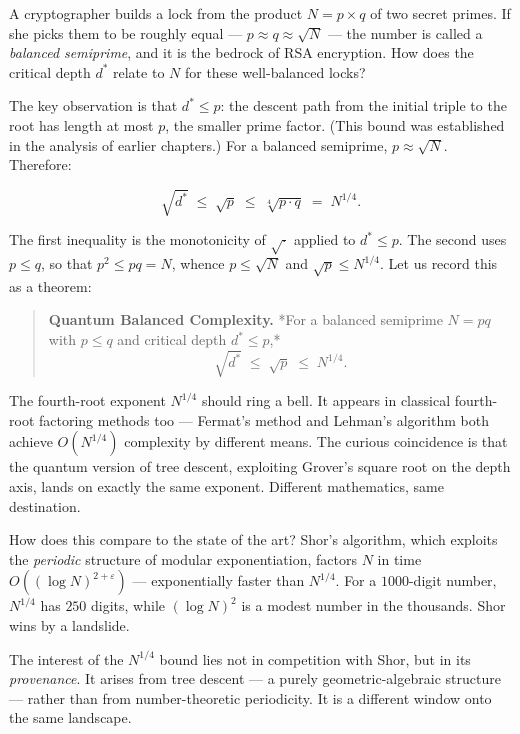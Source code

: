 \documentclass[12pt, letterpaper, openany]{book}
\theoremstyle{definition}
\theoremstyle{remark}
\begin{document}
A cryptographer builds a lock from the product $N = p \times q$ of two secret primes. If she picks them to be roughly equal --- $p \approx q \approx \sqrt{N}$ --- the number is called a \textit{balanced semiprime}, and it is the bedrock of RSA encryption. How does the critical depth $d^*$ relate to $N$ for these well-balanced locks?

The key observation is that $d^* \leq p$: the descent path from the initial triple to the root has length at most $p$, the smaller prime factor. (This bound was established in the analysis of earlier chapters.) For a balanced semiprime, $p \approx \sqrt{N}$. Therefore:

\[
\sqrt{d^*} \;\leq\; \sqrt{p} \;\leq\; \sqrt[4]{p \cdot q} \;=\; N^{1/4}.
\]

The first inequality is the monotonicity of $\sqrt{\cdot}$ applied to $d^* \leq p$. The second uses $p \leq q$, so that $p^2 \leq pq = N$, whence $p \leq \sqrt{N}$ and $\sqrt{p} \leq N^{1/4}$. Let us record this as a theorem:


\begin{quote}
\textbf{Quantum Balanced Complexity.} *For a balanced semiprime $N = pq$ with $p \leq q$ and critical depth $d^* \leq p$,*
$$\sqrt{d^*} \;\leq\; \sqrt{p} \;\leq\; N^{1/4}.$$
\end{quote}


The fourth-root exponent $N^{1/4}$ should ring a bell. It appears in classical fourth-root factoring methods too --- Fermat's method and Lehman's algorithm both achieve $O(N^{1/4})$ complexity by different means. The curious coincidence is that the quantum version of tree descent, exploiting Grover's square root on the depth axis, lands on exactly the same exponent. Different mathematics, same destination.

How does this compare to the state of the art? Shor's algorithm, which exploits the \textit{periodic} structure of modular exponentiation, factors $N$ in time $O((\log N)^{2+\varepsilon})$ --- exponentially faster than $N^{1/4}$. For a $1000$-digit number, $N^{1/4}$ has $250$ digits, while $(\log N)^2$ is a modest number in the thousands. Shor wins by a landslide.

The interest of the $N^{1/4}$ bound lies not in competition with Shor, but in its \textit{provenance}. It arises from tree descent --- a purely geometric-algebraic structure --- rather than from number-theoretic periodicity. It is a different window onto the same landscape.
\end{document}
